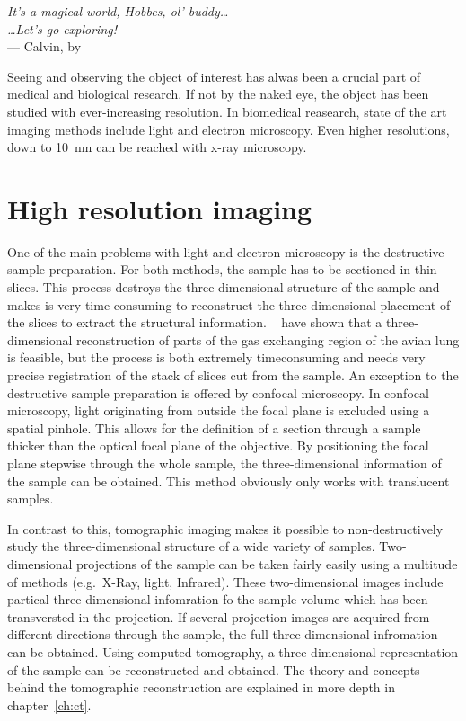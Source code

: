 \label{ch:Introduction}
\begin{flushright}{\slshape    
		It's a magical world, Hobbes, ol' buddy\dots\\
		\dots Let's go exploring!}\\ \medskip
		--- Calvin, by \citep{Watterson1996}
\end{flushright}
\bigskip

Seeing and observing the object of interest has alwas been a crucial part of medical and biological research. If not by the naked eye, the object has been studied with ever-increasing resolution. In biomedical reasearch, state of the art imaging methods include light and electron microscopy. Even higher resolutions, down to \SI{10}{\nano\meter}  can be reached with x-ray microscopy.

\section{High resolution imaging}
One of the main problems with light and electron microscopy is the destructive sample preparation. For both methods, the sample has to be sectioned in thin slices. This process destroys the three-dimensional structure of the sample and makes is very time consuming to reconstruct the three-dimensional placement of the slices to extract the structural information. \citet{Woodward2005}~ have shown that a three-dimensional reconstruction of parts of the gas exchanging region of the avian lung is feasible, but the process is both extremely timeconsuming and needs very precise registration of the stack of slices cut from the sample. An exception to the destructive sample preparation is offered by confocal microscopy. In confocal microscopy, light originating from outside the focal plane is excluded using a spatial pinhole. This allows for the definition of a section through a sample thicker than the optical focal plane of the objective. By positioning the focal plane stepwise through the whole sample, the three-dimensional information of the sample can be obtained. This method obviously only works with translucent samples.

In contrast to this, tomographic imaging makes it possible to non-destructively study the three-dimensional structure of a wide variety of samples. Two-dimensional projections of the sample can be taken fairly easily using a multitude of methods (e.g.\ X-Ray, light, Infrared). These two-dimensional images include partical three-dimensional infomration fo the sample volume which has been transversted in the projection. If several projection images are acquired from different directions through the sample, the full three-dimensional infromation can be obtained. Using computed tomography, a three-dimensional representation of the sample can be reconstructed and obtained. The theory and concepts behind the tomographic reconstruction are explained in more depth in chapter~\ref{ch:ct}.

